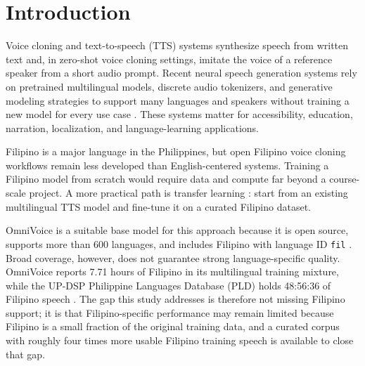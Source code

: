 \documentclass[sigconf,nonacm]{acmart}
\begin{document}


\maketitle

\section{Introduction}

Voice cloning and text-to-speech (TTS) systems synthesize speech from written text and, in zero-shot voice cloning settings, imitate the voice of a reference speaker from a short audio prompt. Recent neural speech generation systems rely on pretrained multilingual models, discrete audio tokenizers, and generative modeling strategies to support many languages and speakers without training a new model for every use case \cite{valle,voicebox,maskgct,omnivoice}. These systems matter for accessibility, education, narration, localization, and language-learning applications.

Filipino is a major language in the Philippines, but open Filipino voice cloning workflows remain less developed than English-centered systems. Training a Filipino model from scratch would require data and compute far beyond a course-scale project. A more practical path is transfer learning \cite{transferlearning}: start from an existing multilingual TTS model and fine-tune it on a curated Filipino dataset.

OmniVoice is a suitable base model for this approach because it is open source, supports more than 600 languages, and includes Filipino with language ID \texttt{fil} \cite{omnivoice}. Broad coverage, however, does not guarantee strong language-specific quality. OmniVoice reports 7.71 hours of Filipino in its multilingual training mixture, while the UP-DSP Philippine Languages Database (PLD) holds 48:56:36 of Filipino speech \cite{pld}. The gap this study addresses is therefore not missing Filipino support; it is that Filipino-specific performance may remain limited because Filipino is a small fraction of the original training data, and a curated corpus with roughly four times more usable Filipino training speech is available to close that gap.
\end{document}
